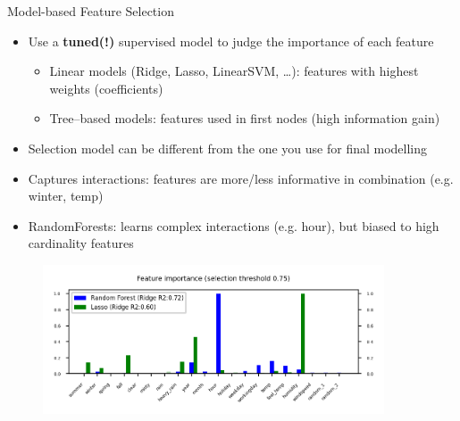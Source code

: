 \begin{frame}[allowframebreaks]{Model-based Feature Selection}
\begin{itemize}
    \item Use a \textbf{tuned(!)} supervised model to judge the importance of each feature
    \begin{itemize}
        \item Linear models (Ridge, Lasso, LinearSVM, \ldots): features with highest weights (coefficients)
        \item Tree–based models: features used in first nodes (high information gain)
    \end{itemize}

    \item Selection model can be different from the one you use for final modelling

    \item Captures interactions: features are more/less informative in combination (e.g. winter, temp)

    \item RandomForests: learns complex interactions (e.g. hour), but biased to high cardinality features
\end{itemize}

\begin{figure}
    \centering
    \includegraphics[width=0.9\textwidth,keepaspectratio]{images/pre-processing/model-based.png}
\end{figure}
\end{frame}



